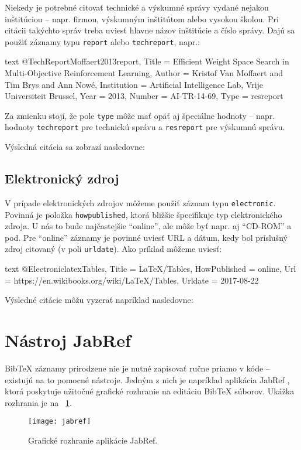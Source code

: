Niekedy je potrebné citovať technické a výskumné správy vydané nejakou inštitúciou -- napr. firmou, výskumným inštitútom alebo vysokou školou. Pri citácii takýchto správ treba uviesť hlavne názov inštitúcie a číslo správy. Dajú sa použiť záznamy typu \texttt{report} alebo \texttt{techreport}, napr.:
\begin{inlinecode}[breaklines]{text}
@TechReport{Moffaert2013report,
  Title                    = {Efficient Weight Space Search in Multi-Objective Reinforcement Learning},
  Author                   = {Kristof Van Moffaert and Tim Brys and Ann Now{\'e}},
  Institution              = {Artificial Intelligence Lab, Vrije Universiteit Brussel},
  Year                     = {2013},
  Number                   = {AI-TR-14-69},
  Type                     = {resreport}
}
\end{inlinecode}
Za zmienku stojí, že pole \texttt{type} môže mať opäť aj špeciálne hodnoty -- napr. hodnoty \texttt{techreport} pre technickú správu a \texttt{resreport} pre výskumnú správu.

Výsledná citácia sa zobrazí nasledovne:

\noindent[X] 

\subsection{Elektronický zdroj}

V prípade elektronických zdrojov môžeme použiť záznam typu \texttt{electronic}. Povinná je položka \texttt{howpublished}, ktorá bližšie špecifikuje typ elektronického zdroja. U nás to bude najčastejšie \enquote{online}, ale môže byť napr. aj \enquote{CD-ROM} a pod. Pre \enquote{online} záznamy je povinné uviesť URL a dátum, kedy bol príslušný zdroj citovaný (v poli \texttt{urldate}). Ako príklad môžeme uviesť:
\begin{inlinecode}[breaklines]{text}
@Electronic{latexTables,
  Title                    = {LaTeX/Tables},
  HowPublished             = {online},
  Url                      = {https://en.wikibooks.org/wiki/LaTeX/Tables},
  Urldate                  = {2017-08-22}
}
\end{inlinecode}

Výsledné citácie môžu vyzerať napríklad nasledovne:

\noindent[X] 

\noindent[X] 

\section{Nástroj JabRef}

BibTeX záznamy prirodzene nie je nutné zapisovať ručne priamo v kóde -- existujú na to pomocné nástroje. Jedným z nich je napríklad aplikácia JabRef \cite{jabref}, ktorá poskytuje užitočné grafické rozhranie na editáciu BibTeX súborov. Ukážka rozhrania je na \figurename~\ref{fig:jabref}.

\begin{figure}
\centering
\texttt{[image: jabref]}
\caption{Grafické rozhranie aplikácie JabRef.}
\label{fig:jabref}
\end{figure}
